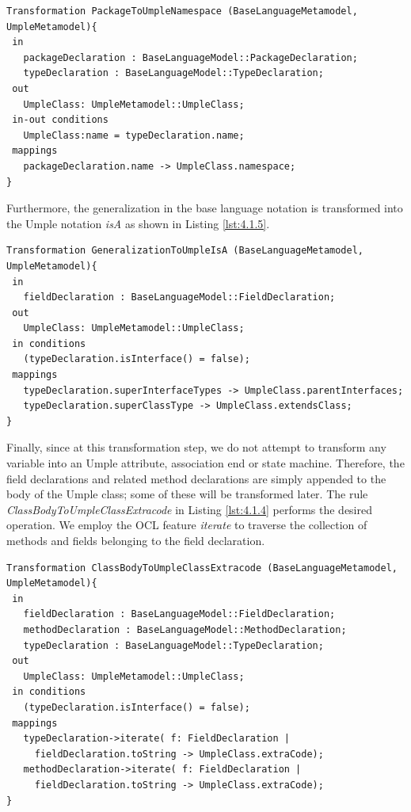 \begin{lstlisting}[style=mine,caption=Rule PackageToUmpleNamespace,label=lst:4.1.3]
Transformation PackageToUmpleNamespace (BaseLanguageMetamodel, UmpleMetamodel){ 
 in
   packageDeclaration : BaseLanguageModel::PackageDeclaration;
   typeDeclaration : BaseLanguageModel::TypeDeclaration;
 out
   UmpleClass: UmpleMetamodel::UmpleClass;
 in-out conditions
   UmpleClass:name = typeDeclaration.name;
 mappings
   packageDeclaration.name -> UmpleClass.namespace;
}
\end{lstlisting}

Furthermore, the generalization in the base language notation is transformed into the Umple notation \textit{isA} as shown in Listing \ref{lst:4.1.5}.

\begin{lstlisting}[style=mine,caption=Rule GeneralizationToUmpleIsA,label=lst:4.1.5]
Transformation GeneralizationToUmpleIsA (BaseLanguageMetamodel, UmpleMetamodel){ 
 in
   fieldDeclaration : BaseLanguageModel::FieldDeclaration;
 out
   UmpleClass: UmpleMetamodel::UmpleClass;
 in conditions
   (typeDeclaration.isInterface() = false);
 mappings
   typeDeclaration.superInterfaceTypes -> UmpleClass.parentInterfaces;
   typeDeclaration.superClassType -> UmpleClass.extendsClass;
}
\end{lstlisting}

Finally, since at this transformation step, we do not attempt to transform any variable into an Umple attribute, association end or state machine. Therefore, the field declarations and related method declarations are simply appended to the body of the Umple class; some of these will be transformed later. The rule \textit{ClassBodyToUmpleClassExtracode} in Listing \ref{lst:4.1.4} performs the desired operation. We employ the OCL feature \textit{iterate} to traverse the collection of methods and fields belonging to the field declaration. 

\begin{lstlisting}[style=mine,caption=Rule ClassBodyToUmpleClassExtracode,label=lst:4.1.4]
Transformation ClassBodyToUmpleClassExtracode (BaseLanguageMetamodel, UmpleMetamodel){ 
 in
   fieldDeclaration : BaseLanguageModel::FieldDeclaration;
   methodDeclaration : BaseLanguageModel::MethodDeclaration;
   typeDeclaration : BaseLanguageModel::TypeDeclaration;
 out
   UmpleClass: UmpleMetamodel::UmpleClass;
 in conditions
   (typeDeclaration.isInterface() = false);
 mappings
   typeDeclaration->iterate( f: FieldDeclaration | 
     fieldDeclaration.toString -> UmpleClass.extraCode);
   methodDeclaration->iterate( f: FieldDeclaration | 
     fieldDeclaration.toString -> UmpleClass.extraCode);
}
\end{lstlisting}

